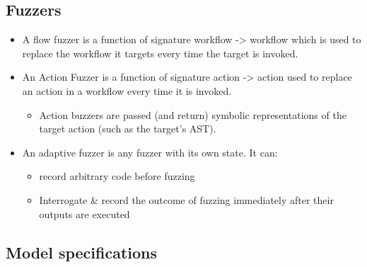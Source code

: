 \documentclass[11pt]{article}
\begin{document}
\subsection{Fuzzers}
\label{sec:org086b3a5}
\begin{itemize}
\item A flow fuzzer is a function of signature workflow -> workflow which is used to replace the workflow it targets every time the target is invoked.
\item An Action Fuzzer is a function of signature action -> action used to replace an action in a workflow every time it is invoked. 
\begin{itemize}
\item Action buzzers are passed (and return) symbolic representations of the target action (such as the target’s AST).
\end{itemize}
\item An adaptive fuzzer is any fuzzer with its own state. It can:
\begin{itemize}
\item record arbitrary code before fuzzing
\item Interrogate \& record the outcome of fuzzing immediately after their outputs are executed
\end{itemize}
\end{itemize}


\subsection{Model specifications}
\label{sec:org1663948}
\end{document}

